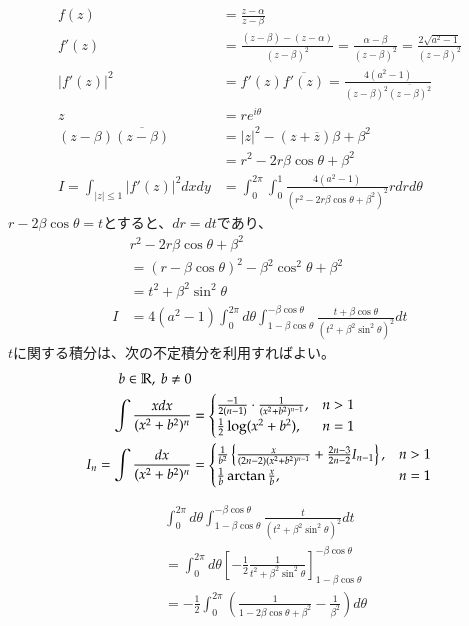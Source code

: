 \begin{align*}
    f(z)&=\frac{z-\alpha}{z-\beta}\\
    f'(z)&=\frac{(z-\beta)-(z-\alpha)}{(z-\beta)^2}
    =\frac{\alpha-\beta}{(z-\beta)^2}=\frac{2\sqrt{a^2-1}}{(z-\beta)^2}\\
    \left|f'(z)\right|^2&=f'(z)\overline{f'(z)}
    =\frac{4(a^2-1)}{(z-\beta)^2\overline{(z-\beta)^2}}\\
    z&=re^{i\theta}\\
    (z-\beta)\overline{(z-\beta)}&=|z|^2-(z+\overline{z})\beta+\beta^2\\
    &=r^2-2r\beta\cos\theta+\beta^2\\
    I=\int_{|z|\le 1}|f'(z)|^2dxdy
    &=\int_{0}^{2\pi}\int_{0}^{1}\frac{4(a^2-1)}{(r^2-2r\beta\cos\theta+\beta^2)^2}rdrd\theta
\end{align*}
$r-2\beta\cos\theta=t$とすると、$dr=dt$であり、
\begin{align*}
    &r^2-2r\beta\cos\theta+\beta^2\\
    &=(r-\beta\cos\theta)^2-\beta^2\cos^2\theta+\beta^2\\
    &=t^2+\beta^2\sin^2\theta\\
    I&=4(a^2-1)\int_{0}^{2\pi}d\theta\int_{1-\beta\cos\theta}^{-\beta\cos\theta}\frac{t+\beta\cos\theta}{(t^2+\beta^2\sin^2\theta)^2}dt
\end{align*}
$t$に関する積分は、次の不定積分を利用すればよい。
\begin{align*}
    b\in\mathbb{R},\ b\neq0&\\
    \int\frac{xdx}{(x^2+b^2)^n}&=\begin{cases}
        \frac{-1}{2(n-1)}\cdot\frac{1}{(x^2+b^2)^{n-1}}, & n>1\\
        \frac{1}{2}\log(x^2+b^2), & n=1
    \end{cases}\\
    I_n=\int\frac{dx}{(x^2+b^2)^n}
    &=\begin{cases}
        \frac{1}{b^2}\left\{\frac{x}{(2n-2)(x^2+b^2)^{n-1}}+\frac{2n-3}{2n-2}I_{n-1}\right\}, & n>1\\
        \frac{1}{b}\arctan\frac{x}{b}, & n=1
    \end{cases}
\end{align*}

\begin{align*}
    &\int_{0}^{2\pi}d\theta\int_{1-\beta\cos\theta}^{-\beta\cos\theta}\frac{t}{(t^2+\beta^2\sin^2\theta)^2}dt\\
    &=\int_{0}^{2\pi}d\theta\left[-\frac{1}{2}\frac{1}{t^2+\beta^2\sin^2\theta}\right]_{1-\beta\cos\theta}^{-\beta\cos\theta}\\
    &=-\frac{1}{2}\int_{0}^{2\pi}\left(\frac{1}{1-2\beta\cos\theta+\beta^2}-\frac{1}{\beta^2}\right)d\theta
\end{align*}

